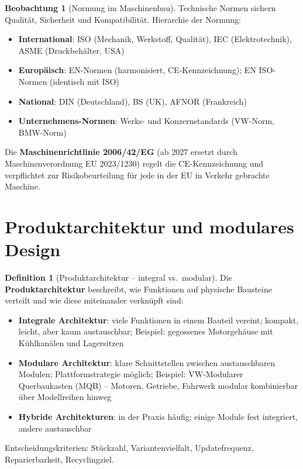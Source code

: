 ﻿\documentclass[a4paper,12pt]{report}
\theoremstyle{definition}
\newtheorem{definition}{Definition}
\newtheorem{beobachtung}{Beobachtung}
\begin{document}
\begin{beobachtung}[Normung im Maschinenbau]
Technische Normen sichern Qualität, Sicherheit und Kompatibilität.
Hierarchie der Normung:
\begin{itemize}
    \item[-] \textbf{International}: ISO (Mechanik, Werkstoff, Qualität),
          IEC (Elektrotechnik), ASME (Druckbehälter, USA)
    \item[-] \textbf{Europäisch}: EN-Normen (harmonisiert, CE-Kennzeichnung);
          EN ISO-Normen (identisch mit ISO)
    \item[-] \textbf{National}: DIN (Deutschland), BS (UK), AFNOR (Frankreich)
    \item[-] \textbf{Unternehmens-Normen}: Werks- und Konzernstandards
          (VW-Norm, BMW-Norm)
\end{itemize}
Die \textbf{Maschinenrichtlinie 2006/42/EG} (ab 2027 ersetzt durch
Maschinenverordnung EU 2023/1230) regelt die CE-Kennzeichnung
und verpflichtet zur Risikobeurteilung für jede in der EU in
Verkehr gebrachte Maschine.
\end{beobachtung}


\section{Produktarchitektur und modulares Design}

\begin{definition}[Produktarchitektur -- integral vs.\ modular]
Die \textbf{Produktarchitektur} beschreibt, wie Funktionen auf physische
Bausteine verteilt und wie diese miteinander verknüpft sind:
\begin{itemize}
    \item[-] \textbf{Integrale Architektur}: viele Funktionen in einem
          Bauteil vereint; kompakt, leicht, aber kaum austauschbar;
          Beispiel: gegossenes Motorgehäuse mit Kühlkanälen und Lagersitzen
    \item[-] \textbf{Modulare Architektur}: klare Schnittstellen zwischen
          austauschbaren Modulen; Plattformstrategie möglich;
          Beispiel: VW-Modularer Querbaukasten (MQB) -- Motoren, Getriebe,
          Fahrwerk modular kombinierbar über Modellreihen hinweg
    \item[-] \textbf{Hybride Architekturen}: in der Praxis häufig;
          einige Module fest integriert, andere austauschbar
\end{itemize}
Entscheidungskriterien: Stückzahl, Variantenvielfalt, Updatefrequenz,
Reparierbarkeit, Recyclingziel.
\end{definition}
\end{document}

